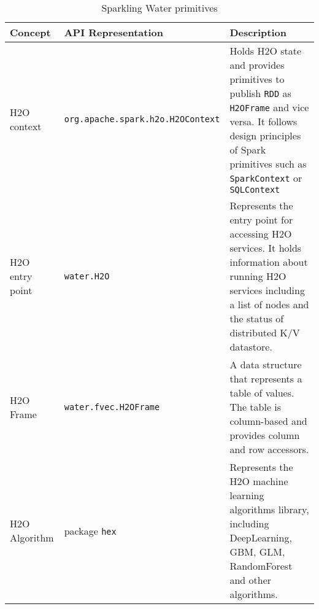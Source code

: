 \begin{table}
\centering
\begin{tabularx}{\textwidth}{l l p{5.5cm}}
\toprule
Concept & API Representation & Description \\
\midrule
H2O context & \texttt{org.apache.spark.h2o.H2OContext} & Holds
H2O state and provides primitives to publish \texttt{RDD} as \texttt{H2OFrame} and
vice versa. It follows design principles of Spark primitives such as
\texttt{SparkContext} or \texttt{SQLContext} \\  \addlinespace

H2O entry point & \texttt{water.H2O} & Represents the entry point for accessing
H2O services. It holds information about running H2O services including a list of
nodes and the status of distributed K/V datastore. \\  \addlinespace

H2O Frame & \texttt{water.fvec.H2OFrame} & A data structure that
represents a table of values. The table is column-based and provides column and
row accessors. \\  \addlinespace

H2O Algorithm & package \texttt{hex} & Represents the H2O machine learning
algorithms library, including DeepLearning, GBM, GLM, RandomForest and other
algorithms. \\

\bottomrule
\end{tabularx}
\caption{Sparkling Water primitives}
\label{tab:primitives}
\end{table}

